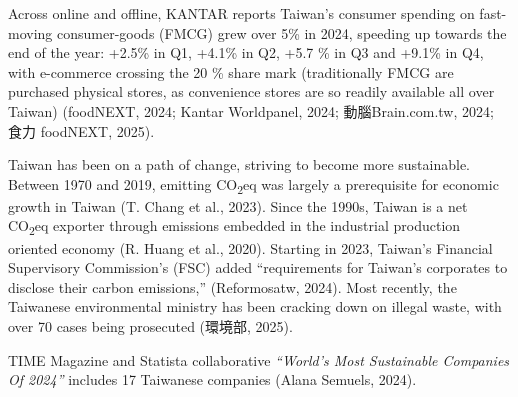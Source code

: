 \documentclass[
  12pt,
  letterpaper,
  DIV=11,
  numbers=noendperiod]{scrartcl}
\begin{document}
Across online and offline, KANTAR reports Taiwan's consumer spending on
fast-moving consumer-goods (FMCG) grew over 5\% in 2024, speeding up
towards the end of the year: +2.5\% in Q1, +4.1\% in Q2, +5.7 \% in Q3
and +9.1\% in Q4, with e-commerce crossing the 20 \% share mark
(traditionally FMCG are purchased physical stores, as convenience stores
are so readily available all over Taiwan) (foodNEXT, 2024; Kantar
Worldpanel, 2024; 動腦Brain.com.tw, 2024; 食力 foodNEXT, 2025).

Taiwan has been on a path of change, striving to become more
sustainable. Between 1970 and 2019, emitting CO\textsubscript{2}eq was
largely a prerequisite for economic growth in Taiwan (T. Chang et al.,
2023). Since the 1990s, Taiwan is a net CO\textsubscript{2}eq exporter
through emissions embedded in the industrial production oriented economy
(R. Huang et al., 2020). Starting in 2023, Taiwan's Financial
Supervisory Commission's (FSC) added ``requirements for Taiwan's
corporates to disclose their carbon emissions,'' (Reformosatw, 2024).
Most recently, the Taiwanese environmental ministry has been cracking
down on illegal waste, with over 70 cases being prosecuted (環境部,
2025).

TIME Magazine and Statista collaborative \emph{``World's Most
Sustainable Companies Of 2024''} includes 17 Taiwanese companies (Alana
Semuels, 2024).

\def\pandoctableshortcapt{World's Most Sustainable Companies}
\end{document}
